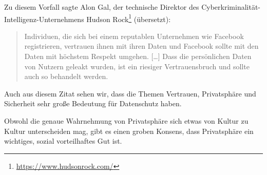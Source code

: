 Zu diesem Vorfall sagte Alon Gal, der technische Direktor des Cyberkriminalität-Intelligenz-Unternehmens Hudson Rock\footnote{\url{https://www.hudsonrock.com/}} (übersetzt):
\blockquote[\cite{holmes_533_2021}]{
    Individuen, die sich bei einem reputablen Unternehmen wie Facebook registrieren, vertrauen ihnen mit ihren Daten
    und Facebook sollte mit den Daten mit höchstem Respekt umgehen. [\dots] 
    Dass die persönlichen Daten von Nutzern geleakt wurden, ist ein riesiger Vertrauensbruch und sollte auch so behandelt werden.
}

Auch aus diesem Zitat sehen wir, dass die Themen Vertrauen, Privatsphäre und Sicherheit sehr große Bedeutung für Datenschutz haben. 

Obwohl die genaue Wahrnehmung von Privatsphäre sich etwas von Kultur zu Kultur unterscheiden mag,
gibt es einen groben Konsens, dass Privatsphäre ein wichtiges, sozial vorteilhaftes Gut ist. \cite{lee_ethical_2016}

